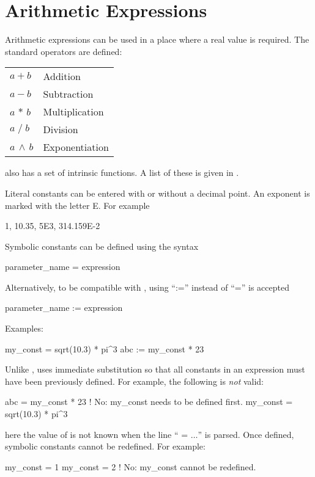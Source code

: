 {{%
\section{Arithmetic Expressions}
\label{arithmetic}

Arithmetic expressions can be used in a place where a real value is required.
The standard operators are defined: \hfil\break
\hspace*{0.15in}
\begin{tabular}{ll}
  $a + b$           & Addition        \\
  $a - b$           & Subtraction     \\
  $a \, \ast \, b$  & Multiplication  \\
  $a \; / \; b$     & Division        \\
  $a \, \land \, b$ & Exponentiation  \\
\end{tabular}
\hfil\break
\bmad also has a set of intrinsic functions. A list of these is given
in .

Literal constants can be entered with or without a decimal point. An
exponent is marked with the letter E. For example
\begin{example}
  1, 10.35, 5E3, 314.159E-2
\end{example}
Symbolic constants can be defined using the syntax
\begin{example}
  parameter_name = expression
\end{example}
Alternatively, to be compatible with \mad, using ``:='' instead of ``='' is accepted
\begin{example}
  parameter_name := expression
\end{example}
Examples:
\begin{example}
  my_const = sqrt(10.3) * pi^3
  abc     := my_const * 23
\end{example}
Unlike \mad, \bmad uses immediate substitution so that all constants
in an expression must have been previously defined. For example, the
following is {\em not} valid:
\begin{example}
  abc      = my_const * 23      ! No: my_const needs to be defined first.
  my_const = sqrt(10.3) * pi^3
\end{example}
here the value of  is not known when the line ``
= $\ldots$'' is parsed. Once
defined, symbolic constants cannot be redefined. For example:
\begin{example}
  my_const = 1
  my_const = 2  ! No: my_const cannot be redefined.
\end{example}

}}
